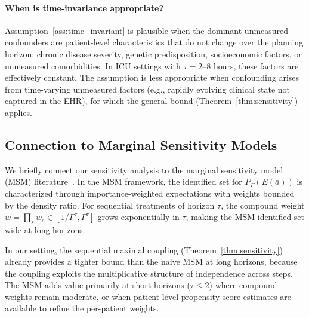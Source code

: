 \documentclass{article}
\newcommand{\ba}{\bar{a}}
\begin{document}
\paragraph{When is time-invariance appropriate?} Assumption~\ref{ass:time_invariant} is plausible when the dominant unmeasured confounders are patient-level characteristics that do not change over the planning horizon: chronic disease severity, genetic predisposition, socioeconomic factors, or unmeasured comorbidities. In ICU settings with $\tau = 2$--$8$ hours, these factors are effectively constant. The assumption is less appropriate when confounding arises from time-varying unmeasured factors (e.g., rapidly evolving clinical state not captured in the EHR), for which the general bound (Theorem~\ref{thm:sensitivity}) applies.

\subsection{Connection to Marginal Sensitivity Models}
\label{app:msm_bounds}

We briefly connect our sensitivity analysis to the marginal sensitivity model (MSM) literature~\citep{tan2006distributional,kallus2021minimax}. In the MSM framework, the identified set for $P_\Gamma(E(\ba))$ is characterized through importance-weighted expectations with weights bounded by the density ratio. For sequential treatments of horizon $\tau$, the compound weight $w = \prod_s w_s \in [1/\Gamma^\tau, \Gamma^\tau]$ grows exponentially in $\tau$, making the MSM identified set wide at long horizons.

In our setting, the sequential maximal coupling (Theorem~\ref{thm:sensitivity}) already provides a tighter bound than the naive MSM at long horizons, because the coupling exploits the multiplicative structure of independence across steps. The MSM adds value primarily at short horizons ($\tau \leq 2$) where compound weights remain moderate, or when patient-level propensity score estimates are available to refine the per-patient weights.
\end{document}
